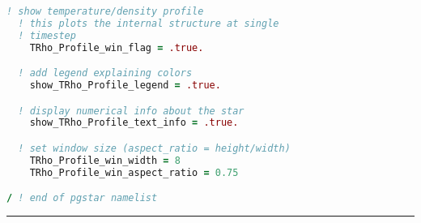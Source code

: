 \begin{landscape}
\begin{lstlisting}[language=Fortran,multicols=2,frame=none]
  ! show temperature/density profile
  ! this plots the internal structure at single 
  ! timestep
    TRho_Profile_win_flag = .true.

  ! add legend explaining colors
    show_TRho_Profile_legend = .true.

  ! display numerical info about the star
    show_TRho_Profile_text_info = .true.

  ! set window size (aspect_ratio = height/width)
    TRho_Profile_win_width = 8
    TRho_Profile_win_aspect_ratio = 0.75

/ ! end of pgstar namelist
\end{lstlisting} 
\vspace{-\baselineskip}
\noindent\rule{\linewidth}{0.4pt}

\end{landscape}
